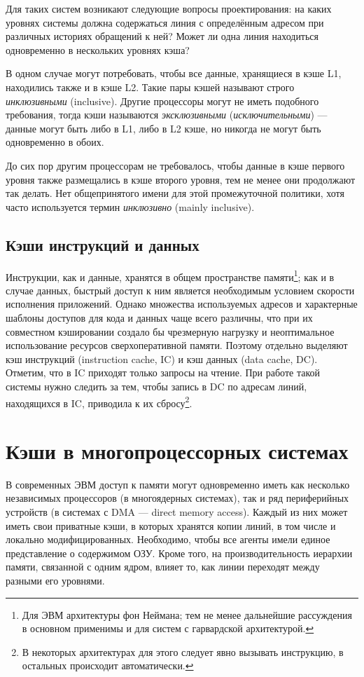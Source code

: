 Для таких систем возникают следующие вопросы проектирования: на каких уровнях системы должна содержаться линия с определённым адресом при различных историях обращений к ней? Может ли одна линия находиться одновременно в нескольких уровнях кэша?

В одном случае могут потребовать, чтобы все данные, хранящиеся в кэше L1, находились также и в кэше L2. Такие пары кэшей называют строго \textit{инклюзивными} (\abbr inclusive). Другие процессоры могут не иметь подобного требования, тогда кэши называются \textit{эксклюзивными} (\textit{исключительными})  --- данные могут быть либо в L1, либо в L2 кэше, но никогда не могут быть одновременно в обоих.

До сих пор другим процессорам не требовалось, чтобы данные в кэше первого уровня также размещались в кэше второго уровня, тем не менее они продолжают так делать. Нет общепринятого имени для этой промежуточной политики, хотя часто используется термин \textit{инклюзивно} (\abbr mainly inclusive).

\subsection{Кэши инструкций и данных}

Инструкции, как и данные, хранятся в общем пространстве памяти\footnote{Для ЭВМ архитектуры фон Неймана; тем не менее дальнейшие рассуждения в основном применимы и для систем с гарвардской архитектурой.}; как и в случае данных, быстрый доступ к ним является необходимым условием скорости исполнения приложений. Однако множества используемых адресов и характерные шаблоны доступов для кода и данных чаще всего различны, что при их совместном кэшировании создало бы чрезмерную нагрузку и неоптимальное использование ресурсов сверх\-опера\-тивной памяти. Поэтому отдельно выделяют кэш инструкций (\abbr instruction cache, IC) и кэш данных (\abbr data cache, DC). Отметим, что в IC приходят только запросы на чтение. При работе такой системы нужно следить за тем, чтобы запись в DC по адресам линий, находящихся в IC, приводила к их сбросу\footnote{В некоторых архитектурах для этого следует явно вызывать инструкцию, в остальных происходит автоматически.}.

\section{Кэши в многопроцессорных системах}

В современных ЭВМ доступ к памяти могут одновременно иметь как несколько независимых процессоров (в многоядерных системах), так и ряд периферийных устройств (в системах с DMA --- direct memory access). Каждый из них может иметь свои приватные кэши, в которых хранятся копии линий, в том числе и локально модифицированных.  Необходимо, чтобы все агенты имели единое представление о содержимом ОЗУ. Кроме того, на производительность иерархии памяти, связанной с одним ядром, влияет то, как линии переходят между разными его уровнями.

